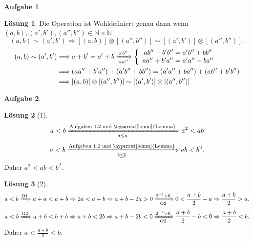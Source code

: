 \documentclass{article}
\theoremstyle{definition}
\newtheorem{ub}{Aufgabe}
\newtheorem*{lo*}{Lösung}
\begin{document}
\begin{ub}
	\begin{lo*}
		Die Operation ist Wohldefiniert genau dann wenn $ (a,b),(a',b'),(a'',b'') \in \mathbb{N} \times \mathbb{N} $
		\[ 
		(a,b) \sim (a',b') \Rightarrow [(a,b)] \otimes [(a'',b'')] \sim [(a',b')] \otimes [(a'',b'')].
		 \]
		\begin{align*}
			(a,b) \sim (a',b') & \Longrightarrow a + b' = a' + b \xRightarrow[\times a'']{\times b''}
			\left\{
			\begin{array}{ccc}
				ab'' + b'b'' = a'b'' + bb'' \\
				aa'' + b'a'' = a'a'' + ba''
			\end{array}
			\right. \\
			& \Longrightarrow (aa'' + b'a'') + (a'b'' + bb'')
			= (a'a'' + ba'') + (ab'' + b'b'') \\
			& \Longrightarrow [(a,b)] \otimes [(a'',b'')] \sim [(a',b')] \otimes [(a'',b'')]
		\end{align*}
	\end{lo*}
\end{ub}
\begin{ub}
	\begin{lo*}[1]
		\[ 
		a < b \xRightarrow[a \leq a]{\text{Aufgaben 1.2 und \hyperref[lemm]{Lemma}}}
		a^2 < ab
		 \]
		 \[ 
		 a < b \xRightarrow[b \leq b]{\text{Aufgaben 1.2 und \hyperref[lemm]{Lemma}}}
		 ab < b^2.
		 \]
		 Daher $ a^2 < ab < b^2 $.
	\end{lo*}
	\begin{lo*}[2]
		\[ 
		a < b \xRightarrow[]{\text{O1}} a + a < a + b \Rightarrow 2a < a+b 
		\Rightarrow a + b - 2a > 0 \xRightarrow[\text{O2}]{2^{-1} > 0} 
		 0 < \frac{a+b}{2} - a \Rightarrow \frac{a+b}{2} > a.
		 \]
		\[ 
		a < b \xRightarrow[]{\text{O2}} a + b < b + b \Rightarrow a + b < 2b 
		\Rightarrow a + b - 2b < 0 \xRightarrow[O2]{2^{-1} > 0} \frac{a+b}{2} - b < 0
		\Rightarrow \frac{a+b}{2} < b.
		 \]
		Daher $ a < \frac{a+b}{2} < b $.
	\end{lo*}
\end{ub}
\end{document}
